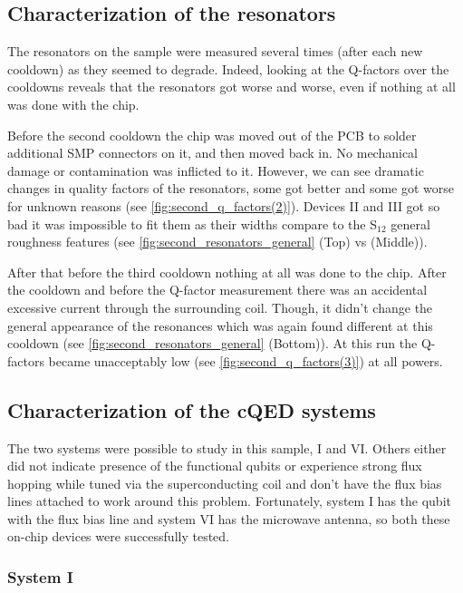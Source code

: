 \subsection{Characterization of the resonators}

The resonators on the sample were measured several times (after each new cooldown) as they seemed to degrade. Indeed, looking at the Q-factors over the cooldowns reveals that the resonators got worse and worse, even if nothing at all was done with the chip.

Before the second cooldown the chip was moved out of the PCB to solder additional SMP connectors on it, and then moved back in. No mechanical damage or contamination was inflicted to it. However, we can see dramatic changes in quality factors of the resonators, some got better and some got worse for unknown reasons (see \autoref{fig:second_q_factors(2)}). Devices II and III got so bad it was impossible to fit them as their widths compare to the S$_{12}$ general roughness features (see \autoref{fig:second_resonators_general} (Top) vs (Middle)).

After that before the third cooldown nothing at all was done to the chip. After the cooldown and before the Q-factor measurement there was an accidental excessive current through the surrounding coil. Though, it didn't change the general appearance of the resonances which was again found different at this cooldown (see \autoref{fig:second_resonators_general} (Bottom)). At this run the Q-factors became unacceptably low (see \autoref{fig:second_q_factors(3)}) at all powers. 


\subsection{Characterization of the cQED systems}

The two systems were possible to study in this sample, I and VI. Others either did not indicate presence of the functional qubits or experience strong flux hopping while tuned via the superconducting coil and don't have the flux bias lines attached to work around this problem. Fortunately, system I has the qubit with the flux bias line and system VI has the microwave antenna, so both these on-chip devices were successfully tested.



\subsubsection{System I}


